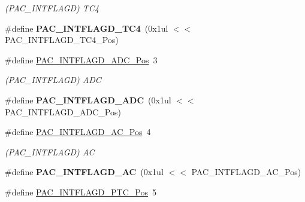 \begin{DoxyCompactItemize}
\begin{DoxyCompactList}\small\item\em (P\+A\+C\+\_\+\+I\+N\+T\+F\+L\+A\+G\+D) T\+C4 \end{DoxyCompactList}\item 
\hypertarget{group___s_a_m_l21___p_a_c_ga1c232c6c4c45fc2390222e20f10c03e5}{}\#define {\bfseries P\+A\+C\+\_\+\+I\+N\+T\+F\+L\+A\+G\+D\+\_\+\+T\+C4}~(0x1ul $<$$<$ P\+A\+C\+\_\+\+I\+N\+T\+F\+L\+A\+G\+D\+\_\+\+T\+C4\+\_\+\+Pos)\label{group___s_a_m_l21___p_a_c_ga1c232c6c4c45fc2390222e20f10c03e5}

\item 
\hypertarget{group___s_a_m_l21___p_a_c_gada3f9892aff2158777c8f65002585ee4}{}\#define \hyperlink{group___s_a_m_l21___p_a_c_gada3f9892aff2158777c8f65002585ee4}{P\+A\+C\+\_\+\+I\+N\+T\+F\+L\+A\+G\+D\+\_\+\+A\+D\+C\+\_\+\+Pos}~3\label{group___s_a_m_l21___p_a_c_gada3f9892aff2158777c8f65002585ee4}

\begin{DoxyCompactList}\small\item\em (P\+A\+C\+\_\+\+I\+N\+T\+F\+L\+A\+G\+D) A\+D\+C \end{DoxyCompactList}\item 
\hypertarget{group___s_a_m_l21___p_a_c_ga8b7e541183b126cbb7a21bef34fbacf9}{}\#define {\bfseries P\+A\+C\+\_\+\+I\+N\+T\+F\+L\+A\+G\+D\+\_\+\+A\+D\+C}~(0x1ul $<$$<$ P\+A\+C\+\_\+\+I\+N\+T\+F\+L\+A\+G\+D\+\_\+\+A\+D\+C\+\_\+\+Pos)\label{group___s_a_m_l21___p_a_c_ga8b7e541183b126cbb7a21bef34fbacf9}

\item 
\hypertarget{group___s_a_m_l21___p_a_c_ga16ca794ee39e1008dbc826becfb383db}{}\#define \hyperlink{group___s_a_m_l21___p_a_c_ga16ca794ee39e1008dbc826becfb383db}{P\+A\+C\+\_\+\+I\+N\+T\+F\+L\+A\+G\+D\+\_\+\+A\+C\+\_\+\+Pos}~4\label{group___s_a_m_l21___p_a_c_ga16ca794ee39e1008dbc826becfb383db}

\begin{DoxyCompactList}\small\item\em (P\+A\+C\+\_\+\+I\+N\+T\+F\+L\+A\+G\+D) A\+C \end{DoxyCompactList}\item 
\hypertarget{group___s_a_m_l21___p_a_c_ga203df0293249ebe74f04c7324c7bc882}{}\#define {\bfseries P\+A\+C\+\_\+\+I\+N\+T\+F\+L\+A\+G\+D\+\_\+\+A\+C}~(0x1ul $<$$<$ P\+A\+C\+\_\+\+I\+N\+T\+F\+L\+A\+G\+D\+\_\+\+A\+C\+\_\+\+Pos)\label{group___s_a_m_l21___p_a_c_ga203df0293249ebe74f04c7324c7bc882}

\item 
\hypertarget{group___s_a_m_l21___p_a_c_ga2c6dcf8d8de4a42d224e2b371bef3a02}{}\#define \hyperlink{group___s_a_m_l21___p_a_c_ga2c6dcf8d8de4a42d224e2b371bef3a02}{P\+A\+C\+\_\+\+I\+N\+T\+F\+L\+A\+G\+D\+\_\+\+P\+T\+C\+\_\+\+Pos}~5\label{group___s_a_m_l21___p_a_c_ga2c6dcf8d8de4a42d224e2b371bef3a02}


\end{DoxyCompactItemize}
